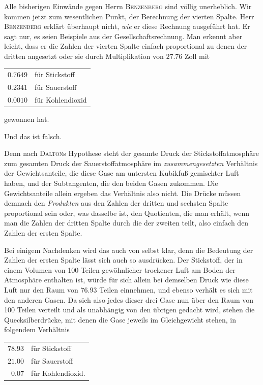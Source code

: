 Alle bisherigen Einwände gegen Herrn \textsc{Benzenberg} sind völlig unerheblich. Wir kommen jetzt zum wesentlichen Punkt, der Berechnung der vierten Spalte. Herr \textsc{Benzenberg} erklärt überhaupt nicht, \textit{wie} er diese Rechnung ausgeführt hat. Er sagt nur, es seien Beispiele aus der Gesellschaftsrechnung. Man erkennt aber leicht, dass er die Zahlen der vierten Spalte einfach proportional zu denen der dritten angesetzt oder sie durch Multiplikation von $27.76$ Zoll mit
\begin{center}\begin{tabular}{rl}
$0.7649$ & für Stickstoff\\
$0.2341$ & für Sauerstoff\\
$0.0010$ & für Kohlendioxid
\end{tabular}\end{center}
gewonnen hat.

Und das ist falsch.

Denn nach \textsc{Dalton}s Hypothese steht der gesamte Druck der Stickstoffatmosphäre zum gesamten Druck der Sauerstoffatmosphäre im \textit{zusammengesetzten} Verhältnis der Gewichtsanteile, die diese Gase am untersten Kubikfuß gemischter Luft haben, und der Subtangenten, die den beiden Gasen zukommen. Die Gewichtsanteile allein ergeben das Verhältnis also nicht. Die Drücke müssen demnach den \textit{Produkten} aus den Zahlen der dritten und sechsten Spalte proportional sein oder, was dasselbe ist, den Quotienten, die man erhält, wenn man die Zahlen der dritten Spalte durch die der zweiten teilt, also einfach den Zahlen der ersten Spalte.

Bei einigem Nachdenken wird das auch von selbst klar, denn die Bedeutung der Zahlen der ersten Spalte lässt sich auch so ausdrücken. Der Stickstoff, der in einem Volumen von 100 Teilen gewöhnlicher trockener Luft am Boden der Atmosphäre enthalten ist, würde für sich allein bei demselben Druck wie diese Luft nur den Raum von $76.93$ Teilen einnehmen, und ebenso
verhält es sich mit den anderen Gasen. Da sich also jedes dieser drei Gase nun über den Raum von 100 Teilen verteilt und als unabhängig von den übrigen gedacht wird, stehen die Quecksilberdrücke, mit denen die Gase jeweils im Gleichgewicht stehen, in folgendem Verhältnis
\begin{center}\begin{tabular}{rl}
$78.93$ & für Stickstoff\\
$21.00$ & für Sauerstoff\\
$0.07$ & für Kohlendioxid.
\end{tabular}\end{center}

